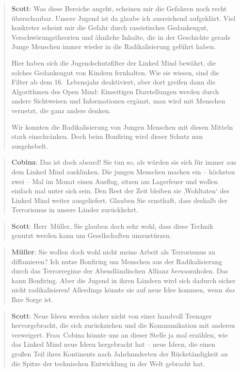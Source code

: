 \documentclass{scrartcl}
\newenvironment{antworta}{
  \begin{quotation}
  }{
  \end{quotation}
}
\newenvironment{antwortb}{
  \begin{quotation}
  }{
  \end{quotation}
}
\newcommand{\name}[1]{\textbf{#1}}
\begin{document}
\begin{antworta}
\name{Scott}: Was diese Bereiche angeht, scheinen mir die
    Gefahren noch recht überschaubar. Unsere Jugend ist da
    glaube ich ausreichend aufgeklärt. Viel konkreter
    scheint mir die Gefahr durch rassistisches Gedankengut,
    Verschwörungstheorien und ähnliche Inhalte, die in der
    Geschichte gerade Junge Menschen immer wieder in die
    Radikalisierung geführt haben.

Hier haben sich die Jugendschutzfilter der Linked Mind
  bewährt, die solches Gedankengut von Kindern
  fernhalten. Wie sie wissen, sind die Filter ab dem
  16.~Lebensjahr deaktiviert, aber dort greifen dann die
  Algorithmen des Open Mind: Einseitigen Darstellungen
  werden durch andere Sichtweisen und Informationen ergänzt,
  man wird mit Menschen vernetzt, die ganz anders denken.

Wir konnten die Radikalisierung von Jungen Menschen mit
  diesen Mitteln stark einschränken. Doch beim Bonfiring
  wird dieser Schutz nun ausgehebelt.
\end{antworta}


\begin{antwortb}
\name{Cobina}: Das ist doch absurd! Sie tun so, als würden sie sich
für immer aus dem Linked Mind ausklinken. Die jungen
Menschen machen ein – höchsten zwei – Mal im Monat einen
Ausflug, sitzen am Lagerfeuer und wollen einfach mal unter
sich sein. Den Rest der Zeit bleiben sie ‚Wohltaten‘ des
Linked Mind weiter ausgeliefert. Glauben Sie ernsthaft, dass
deshalb der Terrorismus in unsere Länder zurückkehrt.
\end{antwortb}


\begin{antworta}
\name{Scott}: Herr~Müller, Sie glauben doch sehr wohl, dass diese
Technik genutzt werden kann um Gesellschaften umzustürzen.
\end{antworta}


\begin{antwortb}
\name{Müller}: Sie wollen doch wohl nicht meine Arbeit als Terrorismus zu diffamieren? Ich nutze Bonfiring um Menschen aus der Radikalisierung durch das Terrorregime der Abendländischen Allianz \emph{heraus}zuholen. Das kann Bonfiring. Aber die Jugend in ihren Ländern wird sich dadurch sicher nicht radikalisieren! Allerdings könnte sie auf neue Idee kommen, wenn \emph{das} Ihre Sorge ist.
\end{antwortb}


\begin{antworta}
\name{Scott}: Neue Ideen werden sicher nicht von einer handvoll
Teenager hervorgebracht, die sich zurückziehen und die
Kommunikation mit anderen verweigert. Frau~Cobina könnte uns
an dieser Stelle ja mal erzählen, wie das Linked Mind neue
Ideen hergebracht hat – neue Ideen, die einen großen Teil
ihres Kontinents nach Jahrhunderten der Rückständigkeit an
die Spitze der technischen Entwicklung in der Welt gebracht
hat.
\end{antworta}
\end{document}
